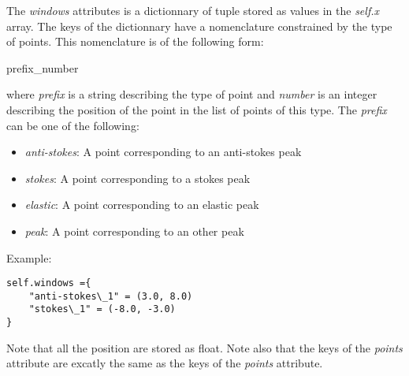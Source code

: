 The \textit{windows} attributes is a dictionnary of tuple stored as values in the \textit{self.x} array. The keys of the dictionnary have a nomenclature constrained by the type of points. This nomenclature is of the following form:
\begin{center}
    prefix\_number
\end{center}
where \textit{prefix} is a string describing the type of point and \textit{number} is an integer describing the position of the point in the list of points of this type. The \textit{prefix} can be one of the following:
\begin{itemize}
    \item \textit{anti-stokes}: A point corresponding to an anti-stokes peak
    \item \textit{stokes}: A point corresponding to a stokes peak
    \item \textit{elastic}: A point corresponding to an elastic peak
    \item \textit{peak}: A point corresponding to an other peak
\end{itemize}

Example:
\begin{lstlisting}
self.windows ={
    "anti-stokes\_1" = (3.0, 8.0)
    "stokes\_1" = (-8.0, -3.0)
}
\end{lstlisting}

Note that all the position are stored as float. Note also that the keys of the \textit{points} attribute are excatly the same as the keys of the \textit{points} attribute.
